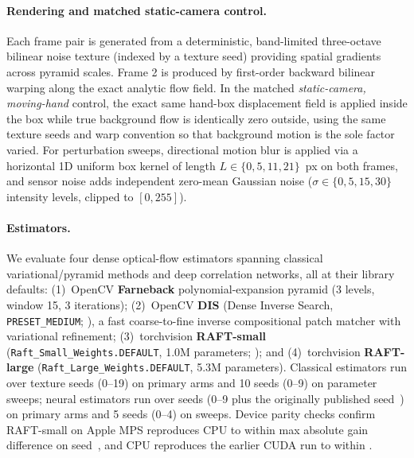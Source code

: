 \documentclass[11pt]{article}
\begin{document}
\paragraph{Rendering and matched static-camera control.}
Each frame pair is generated from a deterministic, band-limited three-octave bilinear noise texture
(indexed by a texture seed) providing spatial gradients across pyramid scales. Frame 2 is produced
by first-order backward bilinear warping along the exact analytic flow field. In the matched
\emph{static-camera, moving-hand} control, the exact same hand-box displacement field is applied
inside the box while true background flow is identically zero outside, using the same texture
seeds and warp convention so that background motion is the sole factor varied. For perturbation
sweeps, directional motion blur is applied via a horizontal 1D uniform box kernel of length
$L \in \{0, 5, 11, 21\}$~px on both frames, and sensor noise adds independent zero-mean Gaussian
noise ($\sigma \in \{0, 5, 15, 30\}$ intensity levels, clipped to $[0, 255]$).

\paragraph{Estimators.}
We evaluate four dense optical-flow estimators spanning classical variational/pyramid methods and
deep correlation networks, all at their library defaults:
(1)~OpenCV \textbf{Farneback} polynomial-expansion pyramid \citep{farneback2003} (3 levels,
window 15, 3 iterations);
(2)~OpenCV \textbf{DIS} (Dense Inverse Search, \texttt{PRESET\_MEDIUM}; \citep{kroeger2016dis}),
a fast coarse-to-fine inverse compositional patch matcher with variational refinement;
(3)~torchvision \textbf{RAFT-small} (\texttt{Raft\_Small\_Weights.DEFAULT}, 1.0M parameters;
\citep{teed2020raft}); and
(4)~torchvision \textbf{RAFT-large} (\texttt{Raft\_Large\_Weights.DEFAULT}, 5.3M parameters).
Classical estimators run over \cgNSeeds{} texture seeds (0--19) on primary arms and 10 seeds
(0--9) on parameter sweeps; neural estimators run over \cgNSeedsRaft{} seeds (0--9 plus the
originally published seed~\cgPubSeed{}) on primary arms and 5 seeds (0--4) on sweeps. Device
parity checks confirm RAFT-small on Apple MPS reproduces CPU to within \cgRaftMpsGap{} max
absolute gain difference on seed~\cgPubSeed{}, and CPU reproduces the earlier CUDA run to within
\cgRaftDevGap{}.
\end{document}
